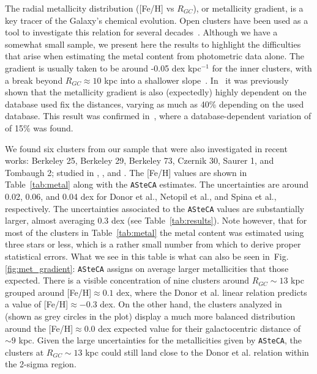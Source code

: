 \documentclass{aa}
\begin{document}
  The radial metallicity distribution ([Fe/H] vs $R_{GC}$), or metallicity
  gradient, is a key tracer of the Galaxy's chemical evolution. Open clusters
  have been used as a tool to investigate this relation for several
  decades~\citep{Janes_1979}.
  Although we have a somewhat small sample, we present here the results to
  highlight the difficulties that arise when estimating the metal content from
  photometric data alone.
  The gradient is usually taken to be around -0.05 dex kpc$^{-1}$ for the inner
  clusters, with a break beyond $R_{GC}\approx10$ kpc into a shallower
  slope~\citep{Donor_2020}. In~\cite{Donor_2018} it was previously shown that
  the metallicity gradient is also (expectedly) highly dependent on the database
  used fix the distances, varying as much as 40\% depending on the used
  database. This result was confirmed in~\citep{Donor_2020}, where a
  database-dependent variation of of 15\% was found.

  We found six clusters from our sample that were also investigated in recent
  works: Berkeley 25, Berkeley 29, Berkeley 73, Czernik 30, Saurer 1, and
  Tombaugh 2; studied in \cite{Donor_2020}, \cite{Netopil_2021}, and
  \cite{Spina_2021}. The [Fe/H] values are shown in Table~\ref{tab:metal} along
  with the \texttt{ASteCA} estimates. The uncertainties are around 0.02, 0.06,
  and 0.04 dex for Donor et al., Netopil et al., and Spina et al., respectively.
  The uncertainties associated to the \texttt{ASteCA} values are substantially
  larger, almost averaging 0.3 dex (see Table~\ref{tab:results}). Note however,
  that for most of the clusters in Table~\ref{tab:metal} the metal content was
  estimated using three stars or less, which is a rather small number from which
  to derive proper statistical errors. What we see in this table is what can
  also be seen in~Fig.\ref{fig:met_gradient}: \texttt{ASteCA} assigns on average
  larger metallicities that those expected.
  There is a visible concentration
  of nine clusters around $R_{GC}\sim13$ kpc grouped around
  [Fe/H]$\approx0.1$ dex, where the Donor et al. linear relation
  predicts a value of [Fe/H]$\approx-0.3$ dex. On the other hand, the clusters
  analyzed in~\cite{Perren_2020} (shown as grey circles in the plot) display a
  much more balanced distribution around the [Fe/H]$\approx0.0$ dex expected
  value for their galactocentric distance of $\sim9$ kpc.
  Given the large uncertainties for the metallicities given by \texttt{ASteCA},
  the clusters at $R_{GC}\sim13$ kpc could still land close to the Donor et al.
  relation within the 2-sigma region.
\end{document}
